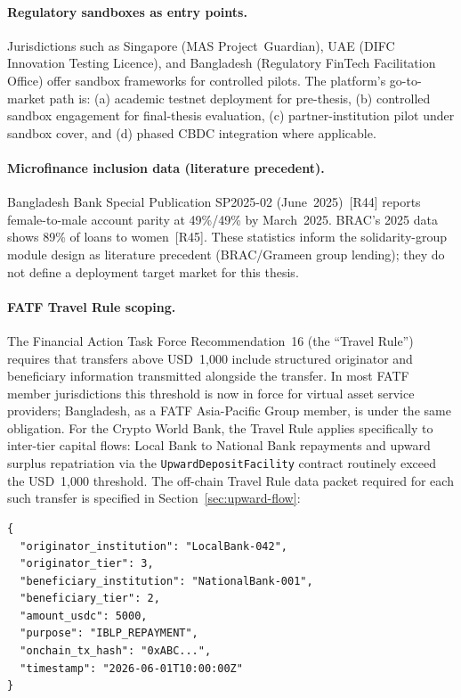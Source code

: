 \documentclass[12pt,a4paper]{report}
\begin{document}
\paragraph{Regulatory sandboxes as entry points.}
Jurisdictions such as Singapore (MAS Project~Guardian), UAE (DIFC Innovation Testing Licence), and Bangladesh (Regulatory FinTech Facilitation Office) offer sandbox frameworks for controlled pilots. The platform's go-to-market path is: (a) academic testnet deployment for pre-thesis, (b) controlled sandbox engagement for final-thesis evaluation, (c) partner-institution pilot under sandbox cover, and (d) phased CBDC integration where applicable.

\paragraph{Microfinance inclusion data (literature precedent).}
Bangladesh Bank Special Publication SP2025-02 (June~2025)~[R44] reports female-to-male account parity at 49\%/49\% by March~2025. BRAC's 2025 data shows 89\% of loans to women~[R45]. These statistics inform the solidarity-group module design as literature precedent (BRAC/Grameen group lending); they do not define a deployment target market for this thesis.

\paragraph{FATF Travel Rule scoping.}
The Financial Action Task Force Recommendation~16 (the ``Travel Rule'') requires that transfers above USD~1{,}000 include structured originator and beneficiary information transmitted alongside the transfer. In most FATF member jurisdictions this threshold is now in force for virtual asset service providers; Bangladesh, as a FATF Asia-Pacific Group member, is under the same obligation. For the Crypto World Bank, the Travel Rule applies specifically to inter-tier capital flows: Local Bank to National Bank repayments and upward surplus repatriation via the \texttt{UpwardDepositFacility} contract routinely exceed the USD~1{,}000 threshold. The off-chain Travel Rule data packet required for each such transfer is specified in Section~\ref{sec:upward-flow}:

\begin{verbatim}
{
  "originator_institution": "LocalBank-042",
  "originator_tier": 3,
  "beneficiary_institution": "NationalBank-001",
  "beneficiary_tier": 2,
  "amount_usdc": 5000,
  "purpose": "IBLP_REPAYMENT",
  "onchain_tx_hash": "0xABC...",
  "timestamp": "2026-06-01T10:00:00Z"
}
\end{verbatim}
\end{document}
